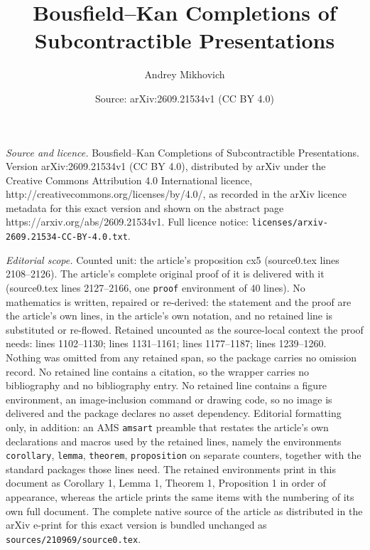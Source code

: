 \documentclass[10pt,a4paper]{amsart}
\title{Bousfield--Kan Completions of Subcontractible Presentations}
\author{Andrey Mikhovich}
\date{Source: arXiv:2609.21534v1 (CC BY 4.0)}
\begin{document}
\maketitle

\noindent\emph{Source and licence.} Bousfield--Kan Completions of Subcontractible Presentations. Version arXiv:2609.21534v1 (CC BY 4.0), distributed by arXiv under the Creative Commons Attribution 4.0 International licence, http://creativecommons.org/licenses/by/4.0/, as recorded in the arXiv licence metadata for this exact version and shown on the abstract page https://arxiv.org/abs/2609.21534v1. Full licence notice: \texttt{licenses/arxiv-2609.21534-CC-BY-4.0.txt}.\par\smallskip

\noindent\textit{Editorial scope.} Counted unit: the article's proposition cx5 (source0.tex lines 2108--2126). The article's complete original proof of it is delivered with it (source0.tex lines 2127--2166, one \texttt{proof} environment of 40 lines). No mathematics is written, repaired or re-derived: the statement and the proof are the article's own lines, in the article's own notation, and no retained line is substituted or re-flowed.  Retained uncounted as the source-local context the proof needs: lines 1102--1130; lines 1131--1161; lines 1177--1187; lines 1239--1260.  Nothing was omitted from any retained span, so the package carries no omission record.  No retained line contains a citation, so the wrapper carries no bibliography and no bibliography entry.  No retained line contains a figure environment, an image-inclusion command or drawing code, so no image is delivered and the package declares no asset dependency.  Editorial formatting only, in addition: an AMS \texttt{amsart} preamble that restates the article's own declarations and macros used by the retained lines, namely the environments \texttt{corollary}, \texttt{lemma}, \texttt{theorem}, \texttt{proposition} on separate counters, together with the standard packages those lines need.  The retained environments print in this document as Corollary 1, Lemma 1, Theorem 1, Proposition 1 in order of appearance, whereas the article prints the same items with the numbering of its own full document.  The complete native source of the article as distributed in the arXiv e-print for this exact version is bundled unchanged as \texttt{sources/210969/source0.tex}.
\end{document}
